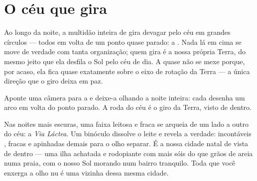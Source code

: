 \section{O céu que gira}

\begin{proposition}\label{prop:g5:stars-night-sky:wheel}
Ao longo da noite, a multidão inteira de  gira devagar pelo
céu em grandes círculos --- todos em volta de um ponto quase parado:
a . Nada lá em cima se move de verdade com tanta
organização; quem gira é a nossa própria Terra, do mesmo jeito que
ela desfila o Sol pelo céu de dia. A  quase não se mexe
porque, por acaso, ela fica quase exatamente sobre o eixo de rotação
da Terra --- a única direção que o giro deixa em paz.
\end{proposition}

\begin{omfigure}

{\small Aponte uma câmera para a  e deixe-a olhando a
noite inteira: cada  desenha um arco em volta do ponto parado.
A roda do céu é o giro da Terra, visto de dentro.}
\end{omfigure}

\begin{example}\label{ex:g5:stars-night-sky:milkyway}
Nas noites mais escuras, uma faixa leitosa e fraca se arqueia de um
lado a outro do céu: a \emph{Via Láctea}. Um
binóculo dissolve o leite e revela a verdade: incontáveis ,
fracas e apinhadas demais para o olho separar. É a nossa cidade natal
de  vista de dentro --- uma ilha achatada e rodopiante com
mais sóis do que grãos de areia numa praia, com o nosso Sol morando
num bairro tranquilo. Toda  que você enxerga a olho nu é uma
vizinha dessa mesma cidade.
\end{example}

